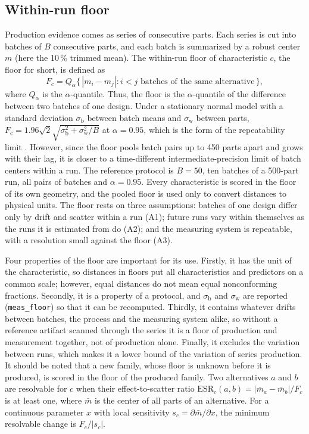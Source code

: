 \documentclass[pdflatex,sn-basic,lineno]{sn-jnl}
\newcommand{\res}[1]{\texttt{#1}}  %
\begin{document}
\subsection{Within-run floor}\label{sec:floor}

Production evidence comes as series of consecutive parts. Each series is cut into batches of $B$ consecutive parts, and each batch is summarized by a robust center $m$ (here the 10\,\% trimmed mean). The within-run floor of characteristic $c$, the floor for short, is defined as
\begin{equation}
F_c = Q_\alpha\bigl\{\,|m_i - m_j| : i< j \text{ batches of the same alternative}\,\bigr\},
\label{eq:floor}
\end{equation}
where $Q_\alpha$ is the $\alpha$-quantile. Thus, the floor is the $\alpha$-quantile of the difference between two batches of one design. Under a stationary normal model with a standard deviation $\sigma_\mathrm{b}$ between batch means and $\sigma_\mathrm{w}$ between parts, $F_c = 1.96\sqrt{2}\sqrt{\sigma_\mathrm{b}^2+\sigma_\mathrm{w}^2/B}$ at $\alpha=0.95$, which is the form of the repeatability limit \citep{iso2025repeatability, iso1994accuracy}. However, since the floor pools batch pairs up to 450 parts apart and grows with their lag, it is closer to a time-different intermediate-precision limit \citep{iso2023intermediate} of batch centers within a run. The reference protocol is $B=50$, ten batches of a 500-part run, all pairs of batches and $\alpha=0.95$. Every characteristic is scored in the floor of its own geometry, and the pooled floor is used only to convert distances to physical units. The floor rests on three assumptions: batches of one design differ only by drift and scatter within a run (A1); future runs vary within themselves as the runs it is estimated from do (A2); and the measuring system is repeatable, with a resolution small against the floor (A3).

Four properties of the floor are important for its use. Firstly, it has the unit of the characteristic, so distances in floors put all characteristics and predictors on a common scale; however, equal distances do not mean equal nonconforming fractions. Secondly, it is a property of a protocol, and $\sigma_\mathrm{b}$ and $\sigma_\mathrm{w}$ are reported (\res{meas\_floor}) so that it can be recomputed. Thirdly, it contains whatever drifts between batches, the process and the measuring system alike, so without a reference artifact scanned through the series it is a floor of production and measurement together, not of production alone. Finally, it excludes the variation between runs, which makes it a lower bound of the variation of series production. It should be noted that a new family, whose floor is unknown before it is produced, is scored in the floor of the produced family. Two alternatives $a$ and $b$ are resolvable for $c$ when their effect-to-scatter ratio $\mathrm{ESR}_c(a,b) = |\bar m_a - \bar m_b|/F_c$ is at least one, where $\bar m$ is the center of all parts of an alternative. For a continuous parameter $x$ with local sensitivity $s_c=\partial\bar m/\partial x$, the minimum resolvable change is $F_c/|s_c|$.
\end{document}
